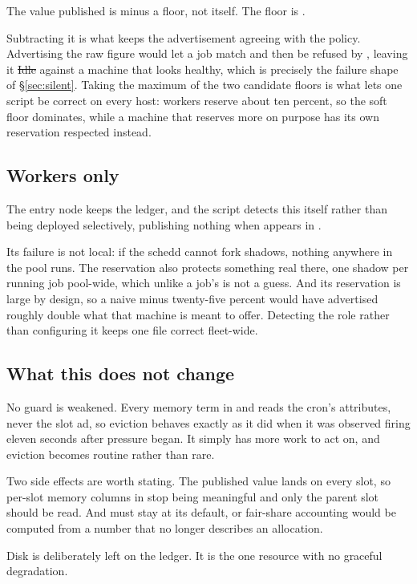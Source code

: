 The value published is  minus a floor, not 
itself. The floor is
.

Subtracting it is what keeps the advertisement agreeing with the policy.
Advertising the raw figure would let a job match and then be refused by
, leaving it \st{Idle} against a machine that looks healthy, which
is precisely the failure shape of \S\ref{sec:silent}. Taking the maximum of the
two candidate floors is what lets one script be correct on every host: workers
reserve about ten percent, so the soft floor dominates, while a machine that
reserves more on purpose has its own reservation respected instead.

\subsection{Workers only}

The entry node keeps the ledger, and the script detects this itself rather than
being deployed selectively, publishing nothing when  appears in
.

Its failure is not local: if the schedd cannot fork shadows, nothing anywhere in
the pool runs. The reservation also protects something real there, one shadow
per running job pool-wide, which unlike a job's  is not a
guess. And its reservation is large by design, so a naive
 minus twenty-five percent would have advertised roughly double
what that machine is meant to offer. Detecting the role rather than configuring
it keeps one file correct fleet-wide.

\subsection{What this does not change}

No guard is weakened. Every memory term in  and  reads the
cron's  attributes, never the slot ad, so eviction behaves exactly as
it did when it was observed firing eleven seconds after pressure began. It
simply has more work to act on, and eviction becomes routine rather than rare.

Two side effects are worth stating. The published value lands on every slot, so
per-slot memory columns in  stop being meaningful and only
the parent slot should be read. And  must stay at its 
default, or fair-share accounting would be computed from a number that no longer
describes an allocation.

Disk is deliberately left on the ledger. It is the one resource with no graceful
degradation.
